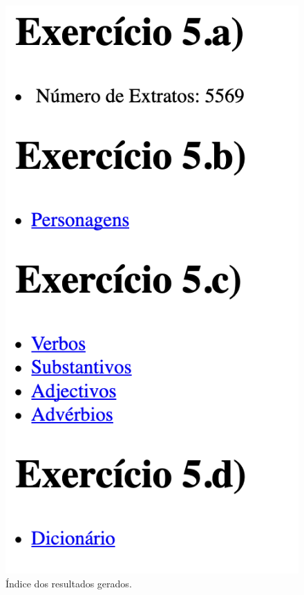 \documentclass[11pt,a4paper]{report}
\begin{document}
\begin{figure}[H]
\centering
\includegraphics[scale=0.6]{index_resultado.png}
\caption{Índice dos resultados gerados.}
\label{img:indice_resultados}
\end{figure}
\end{document}

